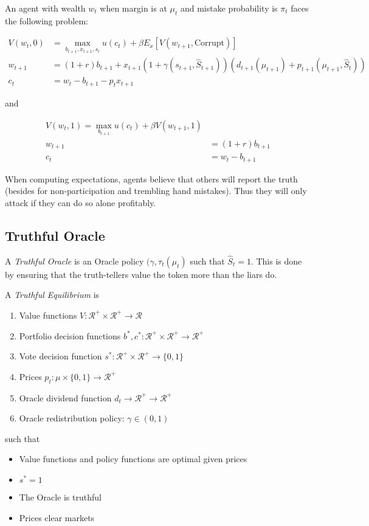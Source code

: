 \documentclass[12pt]{article}
\begin{document}
  An agent with wealth $w_t$ when margin is at $\mu_t$ and mistake probability is $\pi_t$ faces the
  following problem:

  \begin{align}
    V(w_t, 0) &= \max_{b_{t+1}, x_{t+1}, s_{t}} u(c_t) + \beta E_x \left[ V(w_{t+1}, \text{Corrupt}) \right] \\
    w_{t+1} &= (1 + r) b_{t+1} + x_{t+1} (1 + \gamma(s_{t+1}, \hat{S}_{t+1})) (d_{t+1}(\mu_{t+1}) + p_{t+1}(\mu_{t+1}, \hat{S}_t)) \\
    c_t &= w_t - b_{t+1} - p_t x_{t+1}
  \end{align}

  and

  \begin{align*}
    V(w_t, 1) = \max_{b_{t+1}} u(c_t) + \beta V(w_{t+1}, 1) \\
    w_{t+1} &= (1 + r) b_{t+1} \\
    c_t &= w_t - b_{t+1}
  \end{align*}

  When computing expectations, agents believe that others will report the truth (besides for
  non-participation and trembling hand mistakes). Thus they will only attack if they can do so alone
  profitably.

\subsection{Truthful Oracle}

  A \textit{Truthful Oracle} is an Oracle policy $(\gamma, \tau_t(\mu_t)$ such that $\hat{S}_t = 1$. This is done
  by ensuring that the truth-tellers value the token more than the liars do.

  A \textit{Truthful Equilibrium} is

  \begin{enumerate}
    \item Value functions $V : \mathcal{R}^+ \times \mathcal{R}^+ \rightarrow \mathcal{R}$
    \item Portfolio decision functions $b^*, c^* : \mathcal{R}^+ \times \mathcal{R}^+ \rightarrow \mathcal{R}^{+}$
    \item Vote decision function $s^*: \mathcal{R}^+ \times \mathcal{R}^+ \rightarrow \{0, 1 \}$
    \item Prices $p_t : \mu \times \{0, 1\} \rightarrow \mathcal{R}^{+}$
    \item Oracle dividend function $d_t \rightarrow \mathcal{R}^{+} \rightarrow \mathcal{R}^+$
    \item Oracle redistribution policy: $\gamma \in (0, 1)$
  \end{enumerate}

  such that

  \begin{itemize}
    \item Value functions and policy functions are optimal given prices
    \item $s^* = 1$
    \item The Oracle is truthful
    \item Prices clear markets
  \end{itemize}
\end{document}
